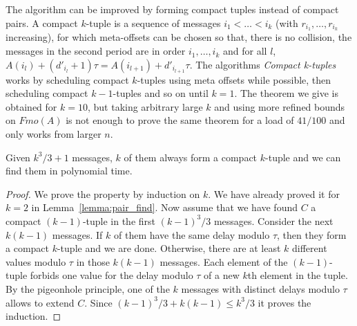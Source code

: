 \documentclass[a4paper,UKenglish,cleveref, autoref, thm-restate]{lipics-v2019}
\begin{document}
The algorithm can be improved by forming compact tuples instead of compact pairs.
A compact $k$-tuple is a sequence of messages $i_1 < \dots < i_k$ (with $r_{i_1},\dots,r_{i_k}$ increasing), for which meta-offsets can be chosen so that, there is no collision, the messages in the second period are in order $i_1,\dots,i_k$ and for all $l$, $A(i_l) + (d'_{i_l} + 1)\tau = A(i_{l+1}) + d'_{i_{l+1}}\tau$.
The algorithms \emph{Compact k-tuples} works by scheduling compact $k$-tuples
using meta offsets while possible, then scheduling compact $k-1$-tuples and so on until $k=1$.
The theorem we give is obtained for $k=10$, but taking arbitrary large $k$ and using more refined bounds on $Fmo(A)$ is not enough to prove the same theorem for a load of $41/100$ and only works from larger $n$.


\begin{lemma}\label{lemma:uple_find}
Given $k^3/3 + 1$ messages, $k$ of them always form a compact $k$-tuple and we can find them in polynomial time. 
\end{lemma}
\begin{proof}
We prove the property by induction on $k$. We have already proved it for $k=2$ in Lemma~\ref{lemma:pair_find}.
Now assume that we have found $C$ a compact $(k-1)$-tuple in the first $(k-1)^3/3$
messages. Consider the next $k(k-1)$ messages. If $k$ of them have the same delay modulo $\tau$,
then they form a compact $k$-tuple and we are done. Otherwise, there are at least $k$ different values modulo $\tau$
in those $k(k-1)$ messages. Each element of the $(k-1)$-tuple forbids one value for the delay modulo $\tau$ of a new $k$th element in the tuple. By the pigeonhole principle, one of the $k$ messages with distinct delays modulo $\tau$ allows to extend $C$. Since $(k-1)^3/3 + k(k-1) \leq k^3/3$ it proves the induction.
\end{proof}
\end{document}
